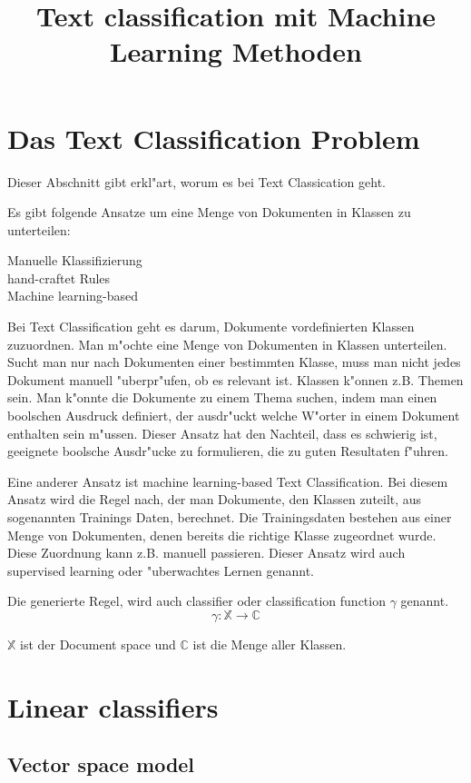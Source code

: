 \documentclass[12pt,a4paper,twoside]{article}
\begin{document}
\title{Text classification mit Machine Learning Methoden}
\maketitle

\section{Das Text Classification Problem}
\label{sec:problem}

Dieser Abschnitt gibt erkl"art, worum es bei Text Classication geht.

Es gibt folgende Ansatze um eine Menge von Dokumenten in Klassen zu unterteilen:
\begin{description}
\item[Manuelle Klassifizierung]
\item[hand-craftet Rules]
\item[Machine learning-based] 
\end{description}


Bei Text Classification geht es darum, Dokumente vordefinierten Klassen zuzuordnen. Man m"ochte eine Menge von Dokumenten in Klassen unterteilen. Sucht man nur nach Dokumenten einer bestimmten Klasse, muss man nicht jedes Dokument manuell "uberpr"ufen, ob es relevant ist. Klassen k"onnen z.B. Themen sein. Man k"onnte die Dokumente zu einem Thema suchen, indem man einen boolschen Ausdruck definiert, der ausdr"uckt welche W"orter in einem Dokument enthalten sein m"ussen. Dieser Ansatz hat den Nachteil, dass es schwierig ist, geeignete boolsche Ausdr"ucke zu formulieren, die zu guten Resultaten f"uhren.

Eine anderer Ansatz ist machine learning-based Text Classification. Bei diesem Ansatz wird die Regel nach, der man Dokumente, den Klassen zuteilt, aus sogenannten Trainings Daten, berechnet. Die Trainingsdaten bestehen aus einer Menge von Dokumenten, denen bereits die richtige Klasse zugeordnet wurde. Diese Zuordnung kann z.B. manuell passieren. Dieser Ansatz wird auch supervised learning oder "uberwachtes Lernen genannt. 

Die generierte Regel, wird auch classifier oder classification function $\gamma$ genannt.
\[
\gamma : \mathbb{X} \to \mathbb{C}
\]

$\mathbb{X}$ ist der Document space und $\mathbb{C}$ ist die Menge aller Klassen.

\section{Linear classifiers}
\label{sec:linearclassifiers}

\subsection{Vector space model}
\label{sec:vectorspacemodel}
\end{document}

